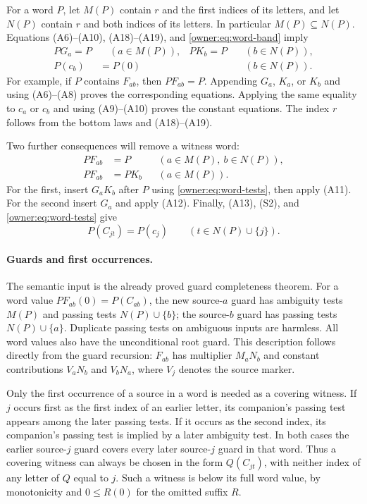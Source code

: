 For a word $P$, let $M(P)$ contain $r$ and the first indices of
its letters, and let $N(P)$ contain $r$ and both indices of its
letters. In particular $M(P)\subseteq N(P)$. Equations
(A6)--(A10), (A18)--(A19), and \eqref{owner:eq:word-band} imply
\begin{align}
 PG_a=P&\quad(a\in M(P)),&
 PK_b=P&\quad(b\in N(P)),\label{owner:eq:word-tests}\\
 P(c_b)&=P(0)&&\quad(b\in N(P)).\label{owner:eq:word-constants}
\end{align}
For example, if $P$ contains $F_{ab}$, then $PF_{ab}=P$.
Appending $G_a$, $K_a$, or $K_b$ and using (A6)--(A8) proves
the corresponding equations. Applying the same equality to $c_a$
or $c_b$ and using (A9)--(A10) proves the constant equations.
The index $r$ follows from the bottom laws and (A18)--(A19).

Two further consequences will remove a witness word:
\begin{align}
 PF_{ab}&=P&& (a\in M(P),\ b\in N(P)),
                 \label{owner:eq:word-capture}\\
 PF_{ab}&=PK_b&& (a\in M(P)).
                 \label{owner:eq:word-weak}
\end{align}
For the first, insert $G_aK_b$ after $P$ using
\eqref{owner:eq:word-tests}, then apply (A11).
For the second insert $G_a$ and apply (A12).
Finally, (A13), (S2), and \eqref{owner:eq:word-tests} give
\begin{equation}\label{owner:eq:word-terminal}
 P(C_{jt})=P(c_j)\qquad(t\in N(P)\cup\{j\}).
\end{equation}

\paragraph{Guards and first occurrences.}
The semantic input is the already proved guard completeness theorem.
For a word value $PF_{ab}(0)=P(C_{ab})$, the new source-$a$ guard
has ambiguity tests $M(P)$ and passing tests $N(P)\cup\{b\}$;
the source-$b$ guard has passing tests $N(P)\cup\{a\}$.
Duplicate passing tests on ambiguous inputs are harmless.
All word values also have the unconditional root guard.
This description follows directly from the guard recursion:
$F_{ab}$ has multiplier $M_aN_b$ and constant contributions
$V_aN_b$ and $V_bN_a$, where $V_j$ denotes the source marker.

Only the first occurrence of a source in a word is needed as a
covering witness. If $j$ occurs first as the first index of an
earlier letter, its companion's passing test appears among the
later passing tests. If it occurs as the second index, its
companion's passing test is implied by a later ambiguity test.
In both cases the earlier source-$j$ guard covers every later
source-$j$ guard in that word. Thus a covering witness can always
be chosen in the form $Q(C_{jt})$, with neither index of any
letter of $Q$ equal to $j$. Such a witness is below its full word
value, by monotonicity and $0\leq R(0)$ for the omitted suffix $R$.

